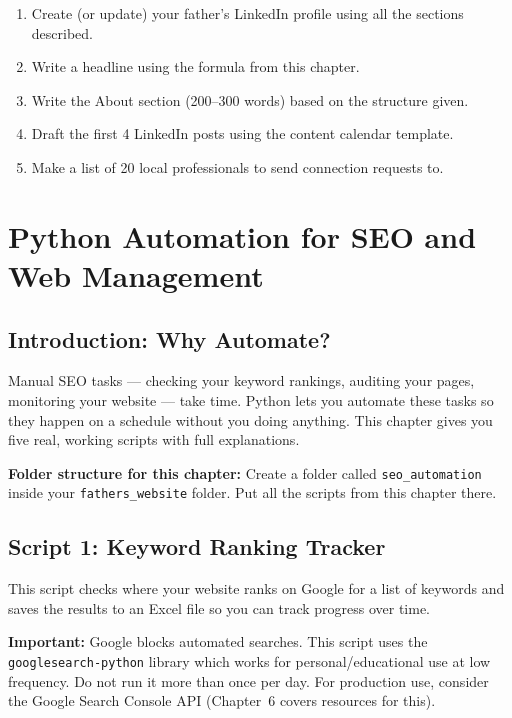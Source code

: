 \documentclass[12pt, a4paper]{book}
\begin{document}
\begin{tcolorbox}[taskbox]
\begin{enumerate}
  \item Create (or update) your father's LinkedIn profile using all the sections described.
  \item Write a headline using the formula from this chapter.
  \item Write the About section (200--300 words) based on the structure given.
  \item Draft the first 4 LinkedIn posts using the content calendar template.
  \item Make a list of 20 local professionals to send connection requests to.
\end{enumerate}
\end{tcolorbox}


\chapter{Python Automation for SEO and Web Management}

\section{Introduction: Why Automate?}

Manual SEO tasks --- checking your keyword rankings, auditing your pages,
monitoring your website --- take time. Python lets you automate these tasks
so they happen on a schedule without you doing anything.
This chapter gives you five real, working scripts with full explanations.

\begin{tcolorbox}[notebox]
\textbf{Folder structure for this chapter:}
Create a folder called \texttt{seo\_automation} inside your \texttt{fathers\_website} folder.
Put all the scripts from this chapter there.
\end{tcolorbox}

\section{Script 1: Keyword Ranking Tracker}

This script checks where your website ranks on Google for a list of keywords
and saves the results to an Excel file so you can track progress over time.

\begin{tcolorbox}[warnbox]
\textbf{Important:} Google blocks automated searches. This script uses
the \texttt{googlesearch-python} library which works for personal/educational use
at low frequency. Do not run it more than once per day. For production use,
consider the Google Search Console API (Chapter~6 covers resources for this).
\end{tcolorbox}
\end{document}
